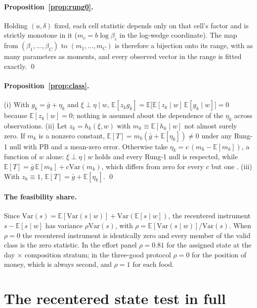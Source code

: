 \documentclass[11pt,a4paper]{article}
\theoremstyle{plain}
\theoremstyle{definition}
\newcommand{\E}{\mathbb{E}}
\newcommand{\Var}{\mathrm{Var}}
\begin{document}
\paragraph{Proposition~\ref{prop:rung0}.} Holding $(u,\delta)$ fixed, each cell statistic depends only on that
cell's factor and is strictly monotone in it ($m_c=b\log\beta_c$ in the log-wedge coordinate). The map from
$(\beta_1,\dots,\beta_C)$ to $(m_1,\dots,m_C)$ is therefore a bijection onto its range, with as many parameters as
moments, and every observed vector in the range is fitted exactly. \qed

\paragraph{Proposition~\ref{prop:class}.} (i) With $g_k=\bar g+\eta_k$ and $\xi\perp\eta\mid w$,
$\E[z_kg_k]=\E\big[\E[z_k\mid w]\,\E[g_k\mid w]\big]=0$ because $\E[z_k\mid w]=0$; nothing is assumed about the
dependence of the $\eta_k$ across observations. (ii) Let $z_k=h_k(\xi,w)$ with $m_k\equiv\E[h_k\mid w]$ not almost
surely zero. If $m_k$ is a nonzero constant, $\E[T]=m_k(\bar g+\E[\eta_k])\ne0$ under any Rung-1 null with PB and a
mean-zero error. Otherwise take $\eta_k=c\,(m_k-\E[m_k])$, a function of $w$ alone: $\xi\perp\eta\mid w$ holds and
every Rung-1 null is respected, while $\E[T]=\bar g\,\E[m_k]+c\Var(m_k)$, which differs from zero for every $c$ but
one \citep[Proposition~1]{borusyakhull2026}. (iii) With $z_k\equiv1$, $\E[T]=\bar g+\E[\eta_k]$. \qed

\paragraph{The feasibility share.} Since $\Var(s)=\E[\Var(s\mid w)]+\Var(\E[s\mid w])$, the recentered instrument
$s-\E[s\mid w]$ has variance $\rho\Var(s)$, with $\rho=\E[\Var(s\mid w)]/\Var(s)$. When $\rho=0$ the recentered
instrument is identically zero and every member of the valid class is the zero statistic. In the effort panel
$\rho=0.81$ for the assigned state at the day $\times$ composition stratum; in the three-good protocol $\rho=0$ for
the position of money, which is always second, and $\rho=1$ for each food.

\section{The recentered state test in full}
\label{app:recentered}
\end{document}
